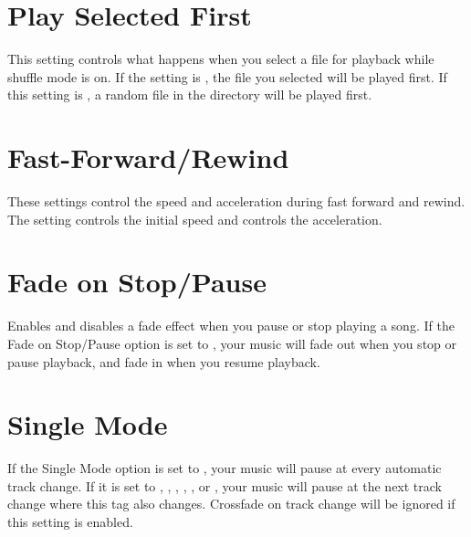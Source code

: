 \section{Play Selected First}
  This setting controls what happens when you
  select a file for playback while shuffle mode is on. If the
   setting is , the file you
  selected will be played first. If this setting is , a random
  file in the directory will be played first.

\section{Fast-Forward/Rewind}
  These settings control the speed and acceleration during fast forward and rewind.
  The setting  controls the initial speed and  controls the acceleration.


\section{Fade on Stop/Pause}
  Enables and disables a fade effect when you
  pause or stop playing a song. If the Fade on Stop/Pause option is
  set to , your music will fade out when you stop or pause 
  playback, and fade in when you resume playback.
    
\section{Single Mode}
  If the Single Mode  option is  set to , your music
  will pause at every automatic track change.
  If it is set to , , ,
  , , or ,
  your music will pause at the next track change where this tag also
  changes. Crossfade on track change will be ignored if this setting is enabled.

